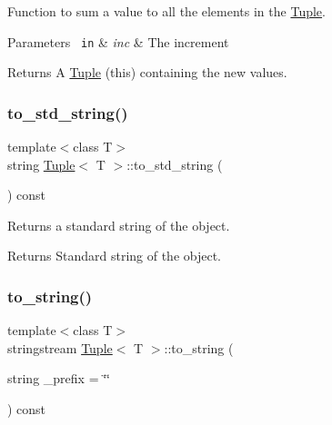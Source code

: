 Function to sum a value to all the elements in the {\ttfamily \mbox{\hyperlink{class_tuple}{Tuple}}}. 


\begin{DoxyParams}[1]{Parameters}
\mbox{\texttt{ in}}  & {\em inc} & The increment\\
\hline
\end{DoxyParams}
\begin{DoxyReturn}{Returns}
A {\ttfamily \mbox{\hyperlink{class_tuple}{Tuple}}} (this) containing the new values. 
\end{DoxyReturn}
\mbox{\label{class_tuple_a2c8e5f6fb1abb2b11ab222b7ce772569}} 
\subsubsection{\texorpdfstring{to\_std\_string()}{to\_std\_string()}}
{\footnotesize\ttfamily template$<$class T$>$ \\
string \mbox{\hyperlink{class_tuple}{Tuple}}$<$ T $>$\+::to\+\_\+std\+\_\+string (\begin{DoxyParamCaption}{ }\end{DoxyParamCaption}) const\hspace{0.3cm}{\ttfamily [inline]}}



Returns a standard string of the object. 

\begin{DoxyReturn}{Returns}
Standard string of the object. 
\end{DoxyReturn}
\mbox{\label{class_tuple_a029b06891c82353ae40c13199830e90a}} 
\subsubsection{\texorpdfstring{to\_string()}{to\_string()}}
{\footnotesize\ttfamily template$<$class T$>$ \\
stringstream \mbox{\hyperlink{class_tuple}{Tuple}}$<$ T $>$\+::to\+\_\+string (\begin{DoxyParamCaption}\item[{string}]{\+\_\+prefix = {\ttfamily \char`\"{}\char`\"{}} }\end{DoxyParamCaption}) const\hspace{0.3cm}{\ttfamily [inline]}}

